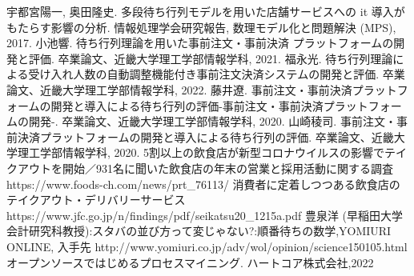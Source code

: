 \documentclass{jsarticle}
\begin{document}
\begin{thebibliography}{99}
 宇都宮陽一, 奥田隆史. 多段待ち行列モデルを用いた店舗サービスへの it 導入がもたらす影響の分析. 情報処理学会研究報告, 数理モデル化と問題解決 (MPS), 2017.
 小池響. 待ち行列理論を用いた事前注文・事前決済 プラットフォームの開発と評価. 卒業論文、近畿大学理工学部情報学科, 2021.
 福永光. 待ち行列理論による受け入れ人数の自動調整機能付き事前注文決済システムの開発と評価. 卒業論文、近畿大学理工学部情報学科, 2022.
藤井遼. 事前注文・事前決済プラットフォームの開発と導入による待ち行列の評価-事前注文・事前決済プラットフォームの開発-. 卒業論文、近畿大学理工学部情報学科, 2020.
山崎稜司. 事前注文・事前決済プラットフォームの開発と導入による待ち行列の評価. 卒業論文、近畿大学理工学部情報学科, 2020.
5割以上の飲食店が新型コロナウイルスの影響でテイクアウトを開始／931名に聞いた飲食店の年末の営業と採用活動に関する調査 https://www.foods-ch.com/news/prt\_76113/  
消費者に定着しつつある飲食店のテイクアウト・デリバリーサービス\\
https://www.jfc.go.jp/n/findings/pdf/seikatsu20\_1215a.pdf
豊泉洋 (早稲田大学会計研究科教授):スタバの並び方って変じゃない?:順番待ちの数学,YOMIURI ONLINE, 入手先 http://www.yomiuri.co.jp/adv/wol/opinion/science150105.html
オープンソースではじめるプロセスマイニング. ハートコア株式会社,2022
\end{thebibliography}
\end{document}
